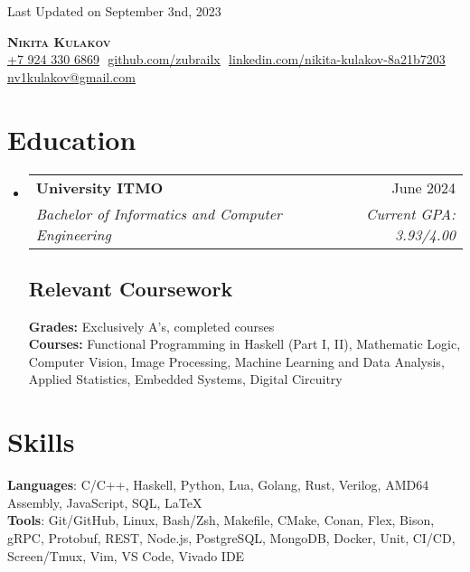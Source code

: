 \documentclass[letterpaper,11pt]{article}
\makeatletter
\newcommand{\resumeSubheading}[4]{
  \vspace{-2pt}\item
    \begin{tabular*}{0.97\textwidth}[t]{l@{\extracolsep{\fill}}r}
      \textbf{#1} & #2 \\
      \textit{\small#3} & \textit{\small #4} \\
    \end{tabular*}\vspace{-7pt}
}
\newcommand{\resumeSubHeadingListStart}{\begin{itemize}[leftmargin=0.15in, label={}]}
\newcommand{\resumeSubHeadingListEnd}{\end{itemize}}
\makeatother
\begin{document}
\begin{flushright}
  \vspace{-4pt}
  \color{gray}
  \item
  Last Updated on September 3nd, 2023
\end{flushright}

\vspace{-7pt}

\begin{center}
    \textbf{\huge \scshape Nikita Kulakov} \\ \vspace{8pt}
    \small 
    \href{tel:79243306869}{\underline{+7 924 330 6869}} $  $
    \href{https://github.com/zubrailx}{\underline{github.com/zubrailx}} $  $
    \href{https://www.linkedin.com/in/nikita-kulakov-8a21b7203/}{\underline{linkedin.com/nikita-kulakov-8a21b7203}} $  $
    \href{mailto:nv1kulakov@gmail.com}
    {\underline{nv1kulakov@gmail.com}}
\end{center}

\section{Education}
  \resumeSubHeadingListStart
  
    \resumeSubheading
      {University ITMO}{June 2024}
      {Bachelor of Informatics and Computer Engineering}{Current GPA: 3.93/4.00}
      
    \subsection{Relevant Coursework}
      \textbf{Grades:} Exclusively A's, completed courses\\
      \textbf{Courses:} Functional Programming in Haskell (Part I, II), Mathematic Logic, Computer Vision, Image Processing, Machine Learning and Data Analysis, Applied Statistics, Embedded Systems, Digital Circuitry\\

  \resumeSubHeadingListEnd

\section{Skills}
 \begin{itemize}[leftmargin=0.15in, label={}]
    \small{\item{
    
     \textbf{Languages}{: C/C++, Haskell, Python, Lua, Golang, Rust, Verilog, AMD64 Assembly, JavaScript, SQL, \LaTeX} \\
     
     \textbf{Tools}{: Git/GitHub, Linux, Bash/Zsh, Makefile, CMake, Conan, Flex, Bison, gRPC, Protobuf, REST, Node.js, PostgreSQL, MongoDB, Docker, Unit, CI/CD, Screen/Tmux, Vim, VS Code, Vivado IDE}
    }}
 \end{itemize}
\end{document}
